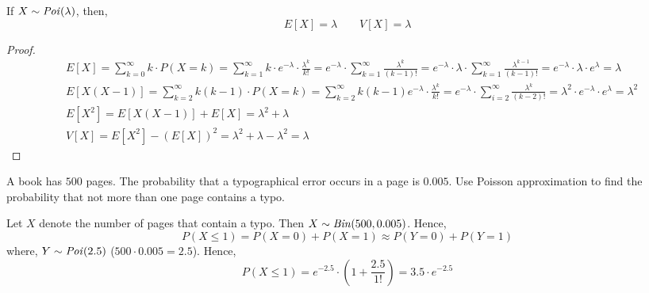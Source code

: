 \begin{theorem}
    If $X \sim \text{\emph{Poi}}(\lambda)$, then,
    \begin{equation*}
        E[X] = \lambda \qquad V[X] = \lambda
    \end{equation*}
\end{theorem}
\begin{proof}
    \begin{align*}
        & E[X] = \sum_{k = 0}^\infty k \cdot P(X = k)                         
               = \sum_{k = 1}^\infty k \cdot e^{-\lambda} \cdot
                 \frac{\lambda^k}{k!}                                         
               = e^{-\lambda} \cdot \sum_{k = 1}^\infty
                 \frac{\lambda^k}{(k-1)!}                                     
               = e^{-\lambda} \cdot \lambda \cdot \sum_{k = 1}^\infty
                 \frac{\lambda^{k-1}}{(k-1)!}                                 
               = e^{-\lambda} \cdot \lambda \cdot e^\lambda 
               = \lambda                                                     \\
        & E[X(X-1)] = \sum_{k = 2}^\infty k(k-1) \cdot P(X = k)
                    = \sum_{k = 2}^\infty k(k-1) e^{-\lambda} \cdot
                      \frac{\lambda^k}{k!}
                    = e^{-\lambda} \cdot \sum_{i = 2}^\infty
                      \frac{\lambda^k}{(k-2)!}
                    = \lambda^2 \cdot e^{-\lambda} \cdot e^\lambda
                    = \lambda^2                                              \\
        & E[X^2] = E[X(X - 1)] + E[X] = \lambda^2 + \lambda                  \\
        & V[X] = E[X^2] - (E[X])^2  
               = \lambda^2 + \lambda - \lambda^2
               = \lambda
    \end{align*}
\end{proof}

\begin{example}
    A book has $500$ pages. The probability that a typographical error occurs
in a page is $0.005$. Use Poisson approximation to find the probability that
not more than one page contains a typo.
\end{example}
\begin{solution}
    Let $X$ denote the number of pages that contain a typo. Then $X
\sim \text{\emph{Bin}}(500, 0.005)$. Hence,
    \[ P(X \leq 1) = P(X = 0) + P(X = 1) \approx P(Y = 0) + P(Y = 1) \]
    where, $Y \sim \text{\emph{Poi}}(2.5)$ ($500 \cdot 0.005 = 2.5$). Hence,
    \[ 
       P(X \leq 1) = e^{-2.5} \cdot (1 + \frac{2.5}{1!})
                   = 3.5 \cdot e^{-2.5}
    \]
\end{solution}

